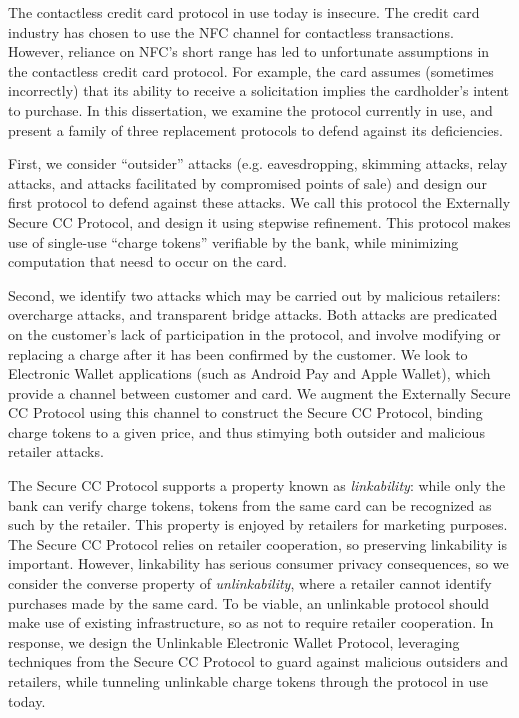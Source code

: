 The contactless credit card protocol in use today is insecure.
The credit card industry has chosen to use the NFC channel for contactless transactions.
However, reliance on NFC's short range has led to unfortunate assumptions in the contactless credit card protocol.
For example, the card assumes (sometimes incorrectly) that its ability to receive a solicitation implies the cardholder's intent to purchase.
In this dissertation, we examine the protocol currently in use,
    and present a family of three replacement protocols to defend against its deficiencies.

First, we consider ``outsider'' attacks (e.g. eavesdropping, skimming attacks, relay attacks, and attacks facilitated by compromised points of sale)
    and design our first protocol to defend against these attacks.
We call this protocol the Externally Secure CC Protocol, and design it using stepwise refinement.
This protocol makes use of single-use ``charge tokens'' verifiable by the bank, while minimizing computation that neesd to occur on the card.

Second, we identify two attacks which may be carried out by malicious retailers:
    overcharge attacks, and transparent bridge attacks.
Both attacks are predicated on the customer's lack of participation in the protocol,
    and involve modifying or replacing a charge after it has been confirmed by the customer.
We look to Electronic Wallet applications (such as Android Pay and Apple Wallet), which provide a channel between customer and card.
We augment the Externally Secure CC Protocol using this channel to construct the Secure CC Protocol,
    binding charge tokens to a given price, and thus stimying both outsider and malicious retailer attacks.

The Secure CC Protocol supports a property known as \emph{linkability}:
    while only the bank can verify charge tokens, tokens from the same card can be recognized as such by the retailer.
This property is enjoyed by retailers for marketing purposes.
The Secure CC Protocol relies on retailer cooperation, so preserving linkability is important.
However, linkability has serious consumer privacy consequences, so we consider the converse property of
    \emph{unlinkability}, where a retailer cannot identify purchases made by the same card.
To be viable, an unlinkable protocol should make use of existing infrastructure, so as not to require retailer cooperation.
In response, we design the Unlinkable Electronic Wallet Protocol,
    leveraging techniques from the Secure CC Protocol to guard against malicious outsiders and retailers,
    while tunneling unlinkable charge tokens through the protocol in use today.
